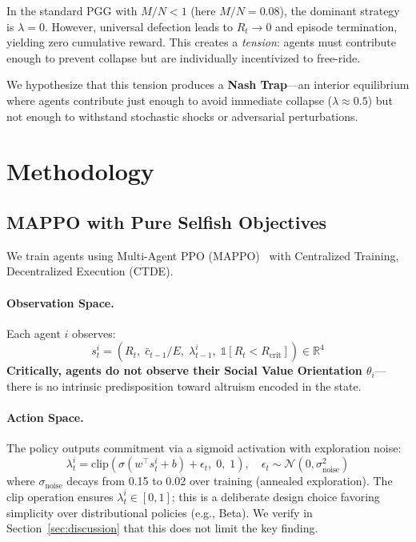 \documentclass{article}
\begin{document}
In the standard PGG with $M/N < 1$ (here $M/N = 0.08$), the dominant strategy is $\lambda = 0$.
However, universal defection leads to $R_t \to 0$ and episode termination, yielding zero cumulative reward.
This creates a \emph{tension}: agents must contribute enough to prevent collapse but are individually incentivized to free-ride.

We hypothesize that this tension produces a \textbf{Nash Trap}---an interior equilibrium where agents contribute just enough to avoid immediate collapse ($\lambda \approx 0.5$) but not enough to withstand stochastic shocks or adversarial perturbations.

\section{Methodology}

\subsection{MAPPO with Pure Selfish Objectives}
\label{sec:mappo}

We train agents using Multi-Agent PPO (MAPPO)~\cite{yu2022surprising} with Centralized Training, Decentralized Execution (CTDE).

\paragraph{Observation Space.}
Each agent $i$ observes:
\begin{equation}
    s_t^i = \left(R_t,\; \bar{c}_{t-1}/E,\; \lambda_{t-1}^i,\; \mathbb{1}[R_t < R_{\text{crit}}]\right) \in \mathbb{R}^4
\end{equation}
\textbf{Critically, agents do not observe their Social Value Orientation $\theta_i$}---there is no intrinsic predisposition toward altruism encoded in the state.

\paragraph{Action Space.}
The policy outputs commitment via a sigmoid activation with exploration noise:
\begin{equation}
    \lambda_t^i = \text{clip}\!\left(\sigma(w^\top s_t^i + b) + \epsilon_t,\; 0,\; 1\right), \quad \epsilon_t \sim \mathcal{N}(0, \sigma_{\text{noise}}^2)
\end{equation}
where $\sigma_{\text{noise}}$ decays from 0.15 to 0.02 over training (annealed exploration).
The clip operation ensures $\lambda_t^i \in [0, 1]$; this is a deliberate design choice favoring simplicity over distributional policies (e.g., Beta).
We verify in Section~\ref{sec:discussion} that this does not limit the key finding.
\end{document}
